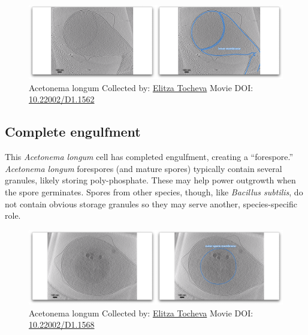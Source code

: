 \documentclass[]{tufte-book}
\begin{document}
\begin{figure}
\includegraphics{movie_stills/8_10} \caption[Acetonema longum Collected by:
\protect\hyperlink{elitza_tocheva}{Elitza Tocheva} Movie DOI:
\href{https://doi.org/10.22002/D1.1562}{10.22002/D1.1562}]{Acetonema longum Collected by:
\protect\hyperlink{elitza_tocheva}{Elitza Tocheva} Movie DOI:
\href{https://doi.org/10.22002/D1.1562}{10.22002/D1.1562}}\label{fig:8-10}
\end{figure}

\hypertarget{Complete_engulfment}{\subsection{Complete
engulfment}\label{Complete_engulfment}}

This \emph{Acetonema longum} cell has completed engulfment, creating a
``forespore.'' \emph{Acetonema longum} forespores (and mature spores)
typically contain several granules, likely storing poly-phosphate. These
may help power outgrowth when the spore germinates. Spores from other
species, though, like \emph{Bacillus subtilis}, do not contain obvious
storage granules so they may serve another, species-specific role.





\begin{figure}
\includegraphics{movie_stills/8_10a} \caption[Acetonema longum Collected by:
\protect\hyperlink{elitza_tocheva}{Elitza Tocheva} Movie DOI:
\href{https://doi.org/10.22002/D1.1568}{10.22002/D1.1568}]{Acetonema longum Collected by:
\protect\hyperlink{elitza_tocheva}{Elitza Tocheva} Movie DOI:
\href{https://doi.org/10.22002/D1.1568}{10.22002/D1.1568}}\label{fig:8-10a}
\end{figure}
\end{document}
